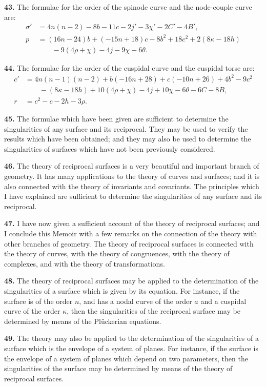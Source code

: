 \documentclass[11pt,a4paper]{article}
\begin{document}
\textbf{43.} The formulae for the order of the spinode curve and the node-couple curve are:
\begin{align*}
\sigma' &= 4n(n-2) - 8b - 11c - 2j' - 3\chi' - 2C' - 4B', \\
p &= (16n-24)b + (-15n+18)c - 8b^2 + 18c^2 + 2(8\kappa-18h) \\
  &\qquad - 9(4\rho+\chi) - 4j - 9\chi - 6\theta.
\end{align*}

\textbf{44.} The formulae for the order of the cuspidal curve and the cuspidal torse are:
\begin{align*}
c' &= 4n(n-1)(n-2) + b(-16n+28) + c(-10n+26) + 4b^2 - 9c^2 \\
   &\qquad - (8\kappa-18h) + 10(4\rho+\chi) - 4j + 10\chi - 6\theta - 6C - 8B, \\
r &= c^2 - c - 2h - 3\rho.
\end{align*}

\textbf{45.} The formulae which have been given are sufficient to determine the singularities of any surface and its reciprocal. They may be used to verify the results which have been obtained; and they may also be used to determine the singularities of surfaces which have not been previously considered.

\textbf{46.} The theory of reciprocal surfaces is a very beautiful and important branch of geometry. It has many applications to the theory of curves and surfaces; and it is also connected with the theory of invariants and covariants. The principles which I have explained are sufficient to determine the singularities of any surface and its reciprocal.

\textbf{47.} I have now given a sufficient account of the theory of reciprocal surfaces; and I conclude this Memoir with a few remarks on the connection of the theory with other branches of geometry. The theory of reciprocal surfaces is connected with the theory of curves, with the theory of congruences, with the theory of complexes, and with the theory of transformations.

\textbf{48.} The theory of reciprocal surfaces may be applied to the determination of the singularities of a surface which is given by its equation. For instance, if the surface is of the order $n$, and has a nodal curve of the order $a$ and a cuspidal curve of the order $\kappa$, then the singularities of the reciprocal surface may be determined by means of the Pl\"uckerian equations.

\textbf{49.} The theory may also be applied to the determination of the singularities of a surface which is the envelope of a system of planes. For instance, if the surface is the envelope of a system of planes which depend on two parameters, then the singularities of the surface may be determined by means of the theory of reciprocal surfaces.
\end{document}
